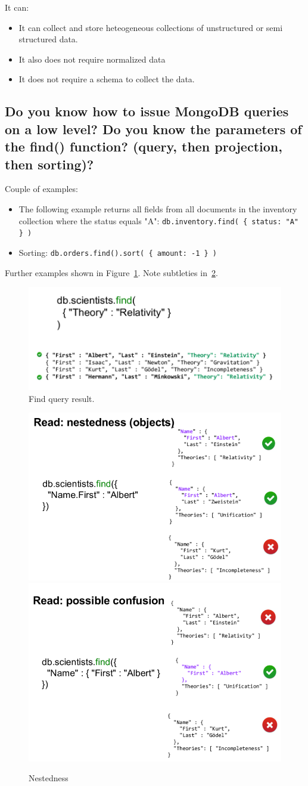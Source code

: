 \documentclass{article}
\begin{document}
It can:
\begin{itemize}
\item It can collect and store heteogeneous collections of unstructured or semi structured data.
\item It also does not require normalized data
\item It does not require a schema to collect the data.
\end{itemize}

\subsection{Do you know how to issue MongoDB queries on a low level? Do you know the parameters of the find() function? (query, then projection, then sorting)?}

Couple of examples:
\begin{itemize}
\item The following example returns all fields from all documents in the inventory collection where the status equals "A": \verb|db.inventory.find( { status: "A" } )|
\item Sorting: \verb|db.orders.find().sort( { amount: -1 } )|
\end{itemize}

Further examples shown in Figure~\ref{fig:queryresult}. Note subtleties in~\ref{fig:nestedness}.

\begin{figure}
  \centering
  \includegraphics[width=.5\textwidth]{img/read_statement_mongodb.png}
  \caption{Find query result.}
  \label{fig:queryresult}
\end{figure}

\begin{figure}
  \centering
  \includegraphics[width=.45\textwidth]{img/nestedness_1.png}
  \hfill
  \includegraphics[width=.45\textwidth]{img/nestedness_2.png}
  \caption{Nestedness}
  \label{fig:nestedness}
\end{figure}
\end{document}
